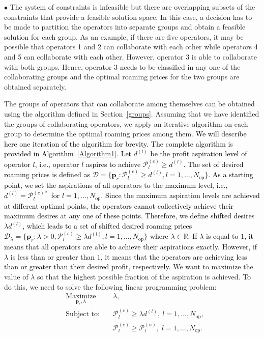 \documentclass[10pt, letter, twocolumn]{IEEEtran}
\begin{document}
$\bullet$ The system of constraints is infeasible but there are overlapping subsets of the constraints that provide a feasible solution space. In this case, a decision has to be made to partition the operators into separate groups and obtain a feasible solution for each group. As an example, if there are five operators, it may be possible that operators 1 and 2 can collaborate with each other while operators 4 and 5 can collaborate with each other. However, operator 3 is able to collaborate with both groups. Hence, operator 3 needs to be classified in any one of the collaborating groups and the optimal roaming prices for the two groups are obtained separately.

The groups of operators that can collaborate among themselves can be obtained using the algorithm defined in Section~\ref{groups}. Assuming that we have identified the groups of collaborating operators, we apply an iterative algorithm on each group to determine the optimal roaming prices among them. \textcolor{black}{We will describe here one iteration of the algorithm for brevity. The complete algorithm is provided in Algorithm~\ref{Algorithm1}. Let $d^{(l)}$ be the profit aspiration level of operator $l$, i.e., operator $l$ aspires to achieve $\mathcal{P}_l^{(c)} \geq d^{(l)}$. The set of desired roaming prices is defined as $\mathcal{D} = \{\mathbf{p}_{r} : \mathcal{P}_l^{(c)} \geq d^{(l)}, l = 1, \ldots , N_{\text{op}}\}$. As a starting point, we set the aspirations of all operators to the maximum level, i.e., $d^{(l)} = \mathcal{P}_l^{(c)*}$ for $l = 1,\ldots,N_{\text{op}} $. Since the maximum aspiration levels are achieved at different optimal points, the operators cannot collectively achieve their maximum desires at any one of these points. \textcolor{black}{Therefore, we define shifted desires $\lambda d^{(l)}$, which leads to a set of shifted desired roaming prices $\mathcal{D}_{\lambda} = \{\mathbf{p}_{r} : \lambda >0,  \mathcal{P}_l^{(c)} \geq \lambda d^{(l)} , l = 1, \ldots, N_{\text{op}} \}$ where $\lambda \in \mathbb R$}. If $\lambda$ is equal to $1$, it means that all operators are able to achieve their aspirations exactly. However, if $\lambda$ is less than or greater than $1$, it means that the operators are achieving less than or greater than their desired profit, respectively.} We want to maximize the value of $\lambda$ so that the highest possible fraction of the aspiration is achieved. To do this, we need to solve the following linear programming problem:
\begin{align}
&\underset{\mathbf{p}_{r} , \lambda}{\text{Maximize}} \ \ \ &&\lambda, \label{eq_lambda}\\
&\text{Subject to:}\; &&\mathcal{P}_{l}^{(c)} \geq \lambda d^{(l)} , \ l = 1, \ldots, N_{\text{op}},  \label{lambda_const1}\\
&&&\mathcal{P}_{l}^{(c)} \geq \mathcal{P}_{l}^{(u)}, \; l = 1,\ldots, N_{\text{op}}.  \label{lambda_const2}
\end{align}
\end{document}
